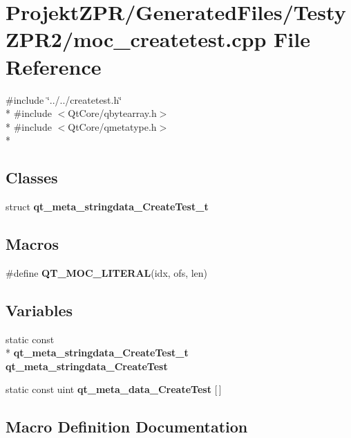 \section{Projekt\-Z\-P\-R/\-Generated\-Files/\-Testy\-Z\-P\-R2/moc\-\_\-createtest.cpp File Reference}
\label{_testy_z_p_r2_2moc__createtest_8cpp}
{\ttfamily \#include \char`\"{}../../createtest.\-h\char`\"{}}\\*
{\ttfamily \#include $<$Qt\-Core/qbytearray.\-h$>$}\\*
{\ttfamily \#include $<$Qt\-Core/qmetatype.\-h$>$}\\*
\subsection*{Classes}
\begin{DoxyCompactItemize}
\item 
struct {\bf qt\-\_\-meta\-\_\-stringdata\-\_\-\-Create\-Test\-\_\-t}
\end{DoxyCompactItemize}
\subsection*{Macros}
\begin{DoxyCompactItemize}
\item 
\#define {\bf Q\-T\-\_\-\-M\-O\-C\-\_\-\-L\-I\-T\-E\-R\-A\-L}(idx, ofs, len)
\end{DoxyCompactItemize}
\subsection*{Variables}
\begin{DoxyCompactItemize}
\item 
static const \\*
{\bf qt\-\_\-meta\-\_\-stringdata\-\_\-\-Create\-Test\-\_\-t} {\bf qt\-\_\-meta\-\_\-stringdata\-\_\-\-Create\-Test}
\item 
static const uint {\bf qt\-\_\-meta\-\_\-data\-\_\-\-Create\-Test} [$\,$]
\end{DoxyCompactItemize}


\subsection{Macro Definition Documentation}
